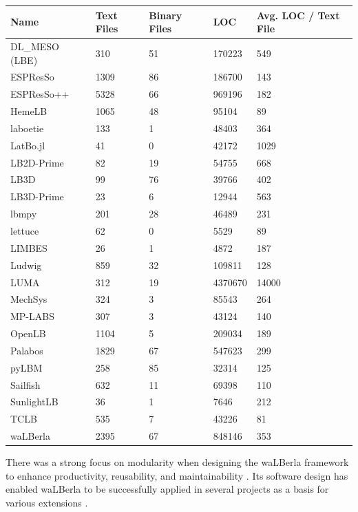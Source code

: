 \documentclass[12pt, notitlepage]{article}
\begin{document}
	\begin{center}
		\begin{onehalfspacing}
		\begin{tabular}{ p{3.5cm}p{2cm}p{2.5cm}p{2cm}p{2.5cm} }
			\hline
			Name & Text Files & Binary Files & LOC & Avg. LOC / Text File\\
			\hline
			DL\_MESO (LBE) & 310 & 51 & 170223& 549\\
			ESPResSo &1309& 86 & 186700&143\\
			ESPResSo++ &5328& 66 & 969196&182\\
			HemeLB &1065& 48 & 95104&89\\
			laboetie &133& 1 & 48403&364\\		
			LatBo.jl &41& 0 & 42172&1029\\
			LB2D-Prime &82& 19 & 54755&668\\
			LB3D &99& 76 & 39766&402\\
			LB3D-Prime &23& 6 & 12944&563\\
			lbmpy&201&  28 & 46489  &231\\
			lettuce &62& 0 & 5529&89\\
			LIMBES &26& 1 & 4872&187\\
			Ludwig&859& 32 & 109811&128\\
			LUMA&312& 19 & 4370670&14000\\
			MechSys &324& 3 & 85543&264\\
			MP-LABS &307& 3 & 43124&140\\
			OpenLB &1104& 5 & 209034&189\\
			Palabos &1829& 67 & 547623&299\\
			pyLBM &258& 85& 32314&125\\
			Sailfish &632& 11 & 69398&110\\
			SunlightLB & 36& 1 & 7646& 212\\
			TCLB &535& 7 & 43226&81\\
			waLBerla & 2395 & 67 & 848146&353\\
			\hline
		\end{tabular}
		\label{moduledata}
		\end{onehalfspacing}
	\end{center}

There was a strong focus on modularity when designing the waLBerla framework to enhance productivity, reusability, and maintainability \citep{bauer2021walberla}. Its software design has enabled waLBerla to be successfully applied in several projects as a basis for various extensions \citep{bauer2021walberla}.
\end{document}
